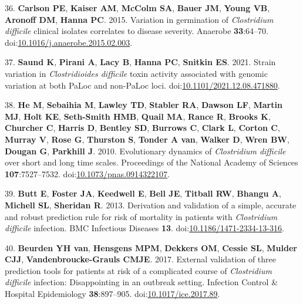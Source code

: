 \documentclass[
  12pt,
]{article}
\newenvironment{cslreferences}%
  {}%
  {\par}
\begin{document}
\begin{cslreferences}
\leavevmode\hypertarget{ref-Carlson2015}{}%
36. \textbf{Carlson PE}, \textbf{Kaiser AM}, \textbf{McColm SA},
\textbf{Bauer JM}, \textbf{Young VB}, \textbf{Aronoff DM}, \textbf{Hanna
PC}. 2015. Variation in germination of \emph{Clostridium difficile}
clinical isolates correlates to disease severity. Anaerobe
\textbf{33}:64--70.
doi:\href{https://doi.org/10.1016/j.anaerobe.2015.02.003}{10.1016/j.anaerobe.2015.02.003}.

\leavevmode\hypertarget{ref-Saund2021}{}%
37. \textbf{Saund K}, \textbf{Pirani A}, \textbf{Lacy B}, \textbf{Hanna
PC}, \textbf{Snitkin ES}. 2021. Strain variation in \emph{Clostridioides
difficile} toxin activity associated with genomic variation at both
PaLoc and non-PaLoc loci.
doi:\href{https://doi.org/10.1101/2021.12.08.471880}{10.1101/2021.12.08.471880}.

\leavevmode\hypertarget{ref-He2010}{}%
38. \textbf{He M}, \textbf{Sebaihia M}, \textbf{Lawley TD},
\textbf{Stabler RA}, \textbf{Dawson LF}, \textbf{Martin MJ},
\textbf{Holt KE}, \textbf{Seth-Smith HMB}, \textbf{Quail MA},
\textbf{Rance R}, \textbf{Brooks K}, \textbf{Churcher C}, \textbf{Harris
D}, \textbf{Bentley SD}, \textbf{Burrows C}, \textbf{Clark L},
\textbf{Corton C}, \textbf{Murray V}, \textbf{Rose G}, \textbf{Thurston
S}, \textbf{Tonder A van}, \textbf{Walker D}, \textbf{Wren BW},
\textbf{Dougan G}, \textbf{Parkhill J}. 2010. Evolutionary dynamics of
\emph{Clostridium difficile} over short and long time scales.
Proceedings of the National Academy of Sciences \textbf{107}:7527--7532.
doi:\href{https://doi.org/10.1073/pnas.0914322107}{10.1073/pnas.0914322107}.

\leavevmode\hypertarget{ref-Butt2013}{}%
39. \textbf{Butt E}, \textbf{Foster JA}, \textbf{Keedwell E},
\textbf{Bell JE}, \textbf{Titball RW}, \textbf{Bhangu A},
\textbf{Michell SL}, \textbf{Sheridan R}. 2013. Derivation and
validation of a simple, accurate and robust prediction rule for risk of
mortality in patients with \emph{Clostridium difficile} infection. BMC
Infectious Diseases \textbf{13}.
doi:\href{https://doi.org/10.1186/1471-2334-13-316}{10.1186/1471-2334-13-316}.

\leavevmode\hypertarget{ref-vanBeurden2017}{}%
40. \textbf{Beurden YH van}, \textbf{Hensgens MPM}, \textbf{Dekkers OM},
\textbf{Cessie SL}, \textbf{Mulder CJJ}, \textbf{Vandenbroucke-Grauls
CMJE}. 2017. External validation of three prediction tools for patients
at risk of a complicated course of \emph{Clostridium difficile}
infection: Disappointing in an outbreak setting. Infection Control \&
Hospital Epidemiology \textbf{38}:897--905.
doi:\href{https://doi.org/10.1017/ice.2017.89}{10.1017/ice.2017.89}.


\end{cslreferences}
\end{document}

